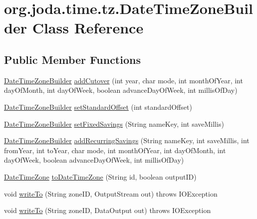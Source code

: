 \hypertarget{classorg_1_1joda_1_1time_1_1tz_1_1_date_time_zone_builder}{\section{org.\-joda.\-time.\-tz.\-Date\-Time\-Zone\-Builder Class Reference}
\label{classorg_1_1joda_1_1time_1_1tz_1_1_date_time_zone_builder}
}
\subsection*{Public Member Functions}
\begin{DoxyCompactItemize}
\item 
\hyperlink{classorg_1_1joda_1_1time_1_1tz_1_1_date_time_zone_builder}{Date\-Time\-Zone\-Builder} \hyperlink{classorg_1_1joda_1_1time_1_1tz_1_1_date_time_zone_builder_a1a5501053207572a9f03c29eda3fd218}{add\-Cutover} (int year, char mode, int month\-Of\-Year, int day\-Of\-Month, int day\-Of\-Week, boolean advance\-Day\-Of\-Week, int millis\-Of\-Day)
\item 
\hyperlink{classorg_1_1joda_1_1time_1_1tz_1_1_date_time_zone_builder}{Date\-Time\-Zone\-Builder} \hyperlink{classorg_1_1joda_1_1time_1_1tz_1_1_date_time_zone_builder_a51b866319f84d383e8ee68f4f7813da7}{set\-Standard\-Offset} (int standard\-Offset)
\item 
\hyperlink{classorg_1_1joda_1_1time_1_1tz_1_1_date_time_zone_builder}{Date\-Time\-Zone\-Builder} \hyperlink{classorg_1_1joda_1_1time_1_1tz_1_1_date_time_zone_builder_aa35a19bf3def34d3facdf1f75e79e5cc}{set\-Fixed\-Savings} (String name\-Key, int save\-Millis)
\item 
\hyperlink{classorg_1_1joda_1_1time_1_1tz_1_1_date_time_zone_builder}{Date\-Time\-Zone\-Builder} \hyperlink{classorg_1_1joda_1_1time_1_1tz_1_1_date_time_zone_builder_adb5b830fc5c1a9ce61e1b8a1ad9c5aa3}{add\-Recurring\-Savings} (String name\-Key, int save\-Millis, int from\-Year, int to\-Year, char mode, int month\-Of\-Year, int day\-Of\-Month, int day\-Of\-Week, boolean advance\-Day\-Of\-Week, int millis\-Of\-Day)
\item 
\hyperlink{classorg_1_1joda_1_1time_1_1_date_time_zone}{Date\-Time\-Zone} \hyperlink{classorg_1_1joda_1_1time_1_1tz_1_1_date_time_zone_builder_a1639de3f211887a14cdfec675340a979}{to\-Date\-Time\-Zone} (String id, boolean output\-I\-D)
\item 
void \hyperlink{classorg_1_1joda_1_1time_1_1tz_1_1_date_time_zone_builder_a4f284090a3b70e5d1915fd37d4f4792e}{write\-To} (String zone\-I\-D, Output\-Stream out)  throws I\-O\-Exception 
\item 
void \hyperlink{classorg_1_1joda_1_1time_1_1tz_1_1_date_time_zone_builder_a52460d4376001c4d2cb59efc54ff6dac}{write\-To} (String zone\-I\-D, Data\-Output out)  throws I\-O\-Exception 
\end{DoxyCompactItemize}

